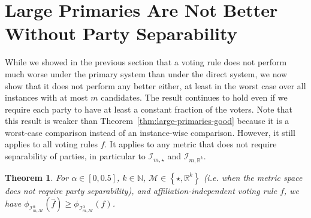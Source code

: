 \documentclass[letterpaper]{article} %
\newtheorem{theorem}{Theorem}
\theoremstyle{definition}
\newcommand{\set}[1]{\left\{#1\right\}}
\renewcommand{\hat}{\widehat}
\newcommand{\bbN}{\mathbb{N}}
\newcommand{\bbR}{\mathbb{R}}
\newcommand{\calI}{\mathcal{I}}
\newcommand{\calM}{\mathcal{M}}
\newcommand{\all}{\star}
\newcommand{\euc}[1]{\bbR^{#1}}
\newcommand{\I}{\calI}
\begin{document}
\section{Large Primaries Are Not Better\\Without Party Separability}
\label{sec:large-primaries-not-better-all}
While we showed in the previous section that a voting rule does not perform much worse under the primary system than under the direct system, we now show that it does not perform any better either, at least in the worst case over all instances with at most $m$ candidates. The result continues to hold even if we require each party to have at least a constant fraction of the voters.
Note that this result is weaker than Theorem~\ref{thm:large-primaries-good} because it is a worst-case comparison instead of an instance-wise comparison. However, it still applies to all voting rules $f$. It applies to any metric that does not require separability of parties, in particular to $\I_{m,\all}$ and $\I_{m,\euc{k}}$.
\begin{theorem}
\label{thm:large-primaries-not-better-all}
	For $\alpha \in [0,0.5]$, $k \in \bbN$, $\calM \in \set{\star,\bbR^k}$ (i.e. when the metric space does not require party separability), and affiliation-independent voting rule $f$, we have $\phi_{\I^{\alpha}_{m,\calM}}(\hat{f}) \ge \phi_{\I^{\alpha}_{m,\calM}}(f)$.
\end{theorem}
\end{document}
